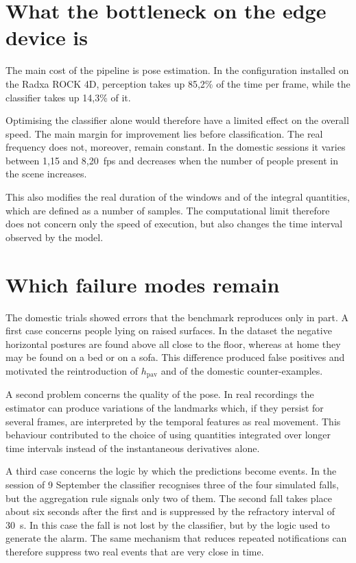 \section{What the bottleneck on the edge device is}

The main cost of the pipeline is pose estimation.
In the configuration installed on the Radxa ROCK 4D, perception takes up 85,2\% of the time per frame, while the classifier takes up 14,3\% of it.

Optimising the classifier alone would therefore have a limited effect on the overall speed. The main margin for improvement lies before classification. The real frequency does not, moreover, remain constant. In the domestic sessions it varies between 1,15 and 8,20~fps and decreases when the number of people present in the scene increases.

This also modifies the real duration of the windows and of the integral quantities, which are defined as a number of samples. The computational limit therefore does not concern only the speed of execution, but also changes the time interval observed by the model.

\section{Which failure modes remain}

The domestic trials showed errors that the benchmark reproduces only in part. A first case concerns people lying on raised surfaces. In the dataset the negative horizontal postures are found above all close to the floor, whereas at home they may be found on a bed or on a sofa. This difference produced false positives and motivated the reintroduction of $h_{\text{pav}}$ and of the domestic counter-examples.

A second problem concerns the quality of the pose. In real recordings the estimator can produce variations of the landmarks which, if they persist for several frames, are interpreted by the temporal features as real movement. This behaviour contributed to the choice of using quantities integrated over longer time intervals instead of the instantaneous derivatives alone.

A third case concerns the logic by which the predictions become events. In the session of 9 September the classifier recognises three of the four simulated falls, but the aggregation rule signals only two of them. The second fall takes place about six seconds after the first and is suppressed by the refractory interval of 30~s. In this case the fall is not lost by the classifier, but by the logic used to generate the alarm. The same mechanism that reduces repeated notifications can therefore suppress two real events that are very close in time.

